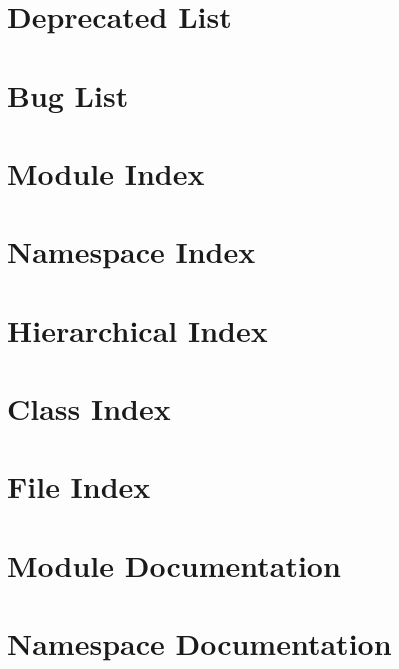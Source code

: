 \documentclass[twoside]{book}
\newcommand{\+}{\discretionary{\mbox{\scriptsize$\hookleftarrow$}}{}{}}
\begin{document}
\chapter{Deprecated List}
\label{deprecated}

\chapter{Bug List}
\label{bug}

\chapter{Module Index}

\chapter{Namespace Index}

\chapter{Hierarchical Index}

\chapter{Class Index}

\chapter{File Index}

\chapter{Module Documentation}





\chapter{Namespace Documentation}



















\end{document}
